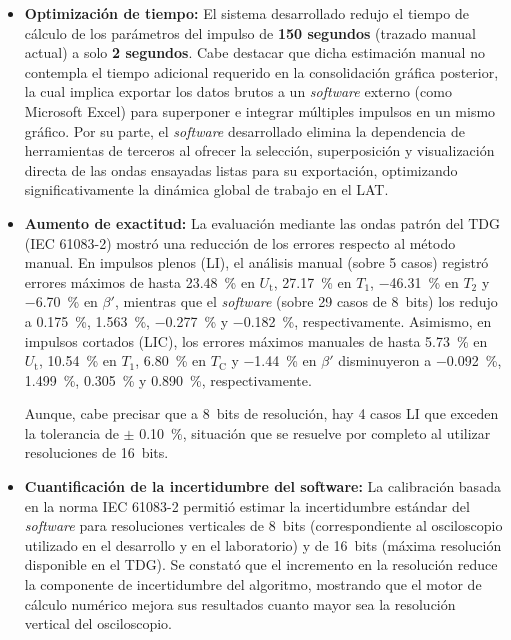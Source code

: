 \begin{itemize}
    \item \textbf{Optimización de tiempo:} El sistema desarrollado redujo el tiempo de cálculo de los parámetros del impulso de \textbf{150 segundos} (trazado manual actual) a solo \textbf{2 segundos}.
    Cabe destacar que dicha estimación manual no contempla el tiempo adicional requerido en la consolidación gráfica posterior, la cual implica exportar los datos brutos a un \emph{software} externo (como Microsoft Excel) para superponer e integrar múltiples impulsos en un mismo gráfico. Por su parte, el \emph{software} desarrollado elimina la dependencia de herramientas de terceros al ofrecer la selección, superposición y visualización directa de las ondas ensayadas listas para su exportación, optimizando significativamente la dinámica global de trabajo en el LAT.

    \item \textbf{Aumento de exactitud:} La evaluación mediante las ondas patrón del TDG (IEC 61083-2) mostró una reducción de los errores respecto al método manual. En impulsos plenos (LI), el análisis manual (sobre 5 casos) registró errores máximos de hasta \qty{23,48}{\percent} en $U_\text{t}$, \qty{27,17}{\percent} en $T_1$, \qty{-46,31}{\percent} en $T_2$ y \qty{-6,70}{\percent} en $\beta'$, mientras que el \emph{software} (sobre 29 casos de \qty{8}{bits}) los redujo a \qty{0,175}{\percent}, \qty{1,563}{\percent}, \qty{-0,277}{\percent} y \qty{-0,182}{\percent}, respectivamente. Asimismo, en impulsos cortados (LIC), los errores máximos manuales de hasta \qty{5,73}{\percent} en $U_\text{t}$, \qty{10,54}{\percent} en $T_1$, \qty{6,80}{\percent} en $T_\text{C}$ y \qty{-1,44}{\percent} en $\beta'$ disminuyeron a \qty{-0,092}{\percent}, \qty{1,499}{\percent}, \qty{0,305}{\percent} y \qty{0,890}{\percent}, respectivamente.
    
    Aunque, cabe precisar que a \qty{8}{bits} de resolución, hay 4 casos LI que exceden la tolerancia de $\pm$ \qty{0,10}{\percent}, situación que se resuelve por completo al utilizar resoluciones de \qty{16}{bits}.

    \item \textbf{Cuantificación de la incertidumbre del software:} La calibración basada en la norma IEC 61083-2 permitió estimar la incertidumbre estándar del \emph{software} para resoluciones verticales de \qty{8}{bits} (correspondiente al osciloscopio utilizado en el desarrollo y en el laboratorio) y de \qty{16}{bits} (máxima resolución disponible en el TDG). Se constató que el incremento en la resolución reduce la componente de incertidumbre del algoritmo, mostrando que el motor de cálculo numérico mejora sus resultados cuanto mayor sea la resolución vertical del osciloscopio.


\end{itemize}

